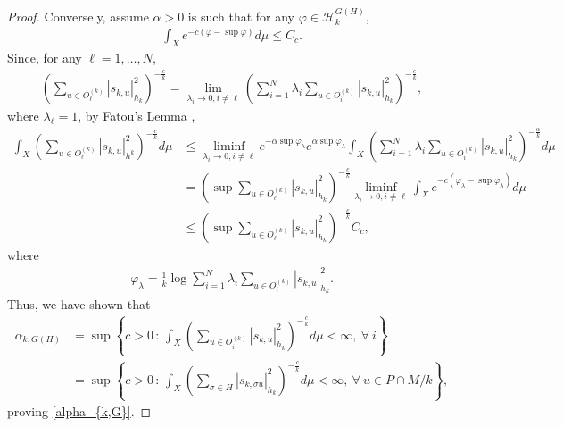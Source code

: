 \documentclass{article}
\newcommand\cH{{\mathcal H}}
\renewcommand{\>}{\rightarrow}
\theoremstyle{plain}
\theoremstyle{definition}
\begin{document}
\begin{proof}
Conversely, assume $\alpha>0$ is such that
for any $\varphi\in \cH_k^{G(H)}$,
\begin{align*}
    \int_X e^{-c(\varphi-\sup\varphi)}d\mu\leq C_c.
\end{align*}
Since, for any $\ell=1,\ldots,N$, 
\begin{align*}
    \left(\sum_{u\in O^{(k)}_\ell}\left|s_{k,u}\right|_{h_k}^2\right)^{-\frac{c}{k}}
    =\lim_{\lambda_i\rightarrow0,i\neq\ell}\left( \sum_{i=1}^N\lambda_i\sum_{u\in O^{(k)}_i}|s_{k,u}|_{h_k}^2\right)^{-\frac{c}{k}},
\end{align*}
where $\lambda_\ell=1$, by Fatou's Lemma \cite[Lemma 2.18]{Folland},
\begin{align*}
    \int_X\left(\sum_{u\in O^{(k)}_\ell}\left|s_{k,u}\right|_{h^k}^2\right)^{-\frac{c}{k}}d\mu
    &\leq \liminf_{\lambda_i\rightarrow0,i\neq\ell} 
    e^{-\alpha\sup\varphi_\lambda}e^{\alpha\sup\varphi_\lambda} 
    \int_X \left( \sum_{i=1}^N\lambda_i\sum_{u\in O^{(k)}_i}|s_{k,u}|_{h_k}^2\right)^{-\frac{\alpha}{k}}d\mu  \\
    &=\left(\sup\sum_{u\in O^{(k)}_\ell}|s_{k,u}|_{h_k}^2\right)^{-\frac{c}{k}}
    \liminf_{\lambda_i\rightarrow0,i\neq\ell} \int_X e^{-c(\varphi_\lambda-\sup\varphi_\lambda)}d\mu\\
    &\leq\left(\sup\sum_{u\in O^{(k)}_\ell}|s_{k,u}|_{h_k}^2\right)^{-\frac{c}{k}}C_c,
\end{align*}
where
\begin{align*}
    \varphi_\lambda
    =\frac{1}{k}\log\sum_{i=1}^N\lambda_i\sum_{u\in O^{(k)}_i}|s_{k,u}|_{h_k}^2.
\end{align*}
Thus, we have shown that 
\begin{align}
    \alpha_{k,G(H)}&=\sup\left\{c>0\,:\,\int_X\left(\sum_{u\in O^{(k)}_i}\left|s_{k,u}\right|_{h_k}^2\right)^{-\frac{c}{k}}d\mu<\infty,~\forall~i\right\}\label{alpha orbit exp}\\
    &=\sup\left\{c>0\,:\,\int_X\left(\sum_{\sigma\in H}\left|s_{k,\sigma u}\right|_{h_k}^2\right)^{-\frac{c}{k}}d\mu<\infty,~\forall~u\in P\cap M/k\right\},\nonumber
\end{align}
proving \eqref{alpha_{k,G}}.
\end{proof}
\end{document}
